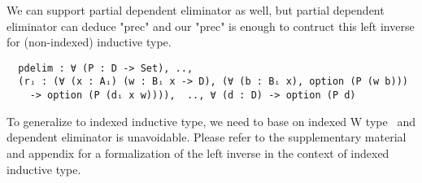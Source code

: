 We can support partial dependent eliminator as well, but partial dependent eliminator can deduce "prec" and our "prec" is enough to contruct this left inverse for (non-indexed) inductive type. 
\begin{verbatim}
  pdelim : ∀ (P : D -> Set), .., 
  (rᵢ : (∀ (x : Aᵢ) (w : Bᵢ x -> D), (∀ (b : Bᵢ x), option (P (w b))) 
    -> option (P (dᵢ x w)))),  .., ∀ (d : D) -> option (P d)
\end{verbatim}
To generalize to indexed inductive type, we need to base on indexed W type~\cite{martin1982constructive, morris2009indexed,jashug2017} and dependent eliminator is unavoidable. Please refer to the supplementary material and appendix for a formalization of the left inverse in the context of indexed inductive type.   
